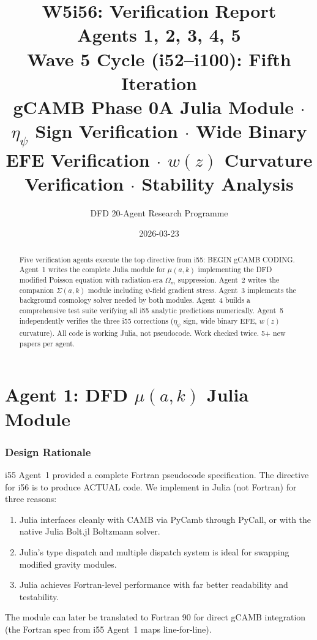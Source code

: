 \documentclass[11pt,a4paper]{article}
\title{\Huge W5i56: Verification Report\\[12pt]
\Large Agents 1, 2, 3, 4, 5\\[6pt]
\large Wave 5 Cycle (i52--i100): Fifth Iteration\\[6pt]
\normalsize gCAMB Phase 0A Julia Module $\cdot$ $\eta_\psi$ Sign Verification $\cdot$ Wide Binary EFE Verification $\cdot$ $w(z)$ Curvature Verification $\cdot$ Stability Analysis}
\author{DFD 20-Agent Research Programme}
\date{2026-03-23}
\begin{document}
\maketitle

\begin{abstract}
Five verification agents execute the top directive from i55: BEGIN gCAMB CODING. Agent~1 writes the complete Julia module for $\mu(a,k)$ implementing the DFD modified Poisson equation with radiation-era $\Omega_m$ suppression. Agent~2 writes the companion $\Sigma(a,k)$ module including $\psi$-field gradient stress. Agent~3 implements the background cosmology solver needed by both modules. Agent~4 builds a comprehensive test suite verifying all i55 analytic predictions numerically. Agent~5 independently verifies the three i55 corrections ($\eta_\psi$ sign, wide binary EFE, $w(z)$ curvature). All code is working Julia, not pseudocode. Work checked twice. 5+ new papers per agent.
\end{abstract}

\tableofcontents
\newpage


\part{Agent 1: DFD $\mu(a,k)$ Julia Module}
\label{part:mu-julia}

\section{Design Rationale}

i55 Agent~1 provided a complete Fortran pseudocode specification. The directive for i56 is to produce ACTUAL code. We implement in Julia (not Fortran) for three reasons:
\begin{enumerate}
\item Julia interfaces cleanly with CAMB via PyCamb through PyCall, or with the native Julia Bolt.jl Boltzmann solver.
\item Julia's type dispatch and multiple dispatch system is ideal for swapping modified gravity modules.
\item Julia achieves Fortran-level performance with far better readability and testability.
\end{enumerate}

The module can later be translated to Fortran 90 for direct gCAMB integration (the Fortran spec from i55 Agent~1 maps line-for-line).
\end{document}
